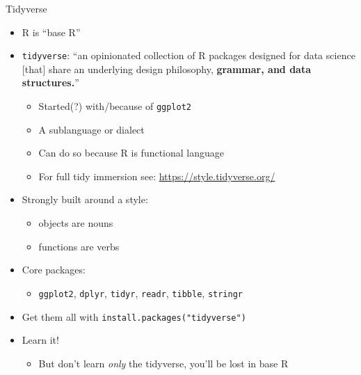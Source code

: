 \documentclass[ignorenonframetext,]{beamer}
\providecommand{\tightlist}{%
  \setlength{\itemsep}{0pt}\setlength{\parskip}{0pt}}
\begin{document}
\begin{frame}[fragile]{Tidyverse}
\protect\hypertarget{tidyverse}{}

\begin{itemize}
\tightlist
\item
  R is ``base R''
\item
  \texttt{tidyverse}: ``an opinionated collection of R packages designed
  for data science {[}that{]} share an underlying design philosophy,
  \textbf{grammar, and data structures.}''

  \begin{itemize}
  \tightlist
  \item
    Started(?) with/because of \texttt{ggplot2}
  \item
    A sublanguage or dialect
  \item
    Can do so because R is functional language
  \item
    For full tidy immersion see: \url{https://style.tidyverse.org/}
  \end{itemize}
\item
  Strongly built around a style:

  \begin{itemize}
  \tightlist
  \item
    objects are nouns
  \item
    functions are verbs
  \end{itemize}
\item
  Core packages:

  \begin{itemize}
  \tightlist
  \item
    \texttt{ggplot2}, \texttt{dplyr}, \texttt{tidyr}, \texttt{readr},
    \texttt{tibble}, \texttt{stringr}
  \end{itemize}
\item
  Get them all with \texttt{install.packages("tidyverse")}
\item
  Learn it!

  \begin{itemize}
  \tightlist
  \item
    But don't learn \emph{only} the tidyverse, you'll be lost in base R
  \end{itemize}
\end{itemize}

\end{frame}
\end{document}
